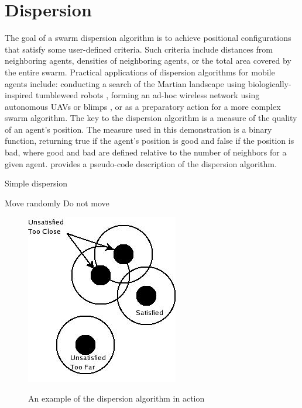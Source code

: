 \section{Dispersion}
\label{sec:Dispersion}

The goal of a swarm dispersion algorithm is to achieve positional configurations that satisfy some user-defined criteria.  Such criteria include distances from neighboring agents, densities of neighboring agents, or the total area covered by the entire swarm.  Practical applications of dispersion algorithms for mobile agents include: conducting a search of the Martian landscape using biologically-inspired tumbleweed robots \cite{kolacinski:SwarmRovers}, forming an ad-hoc wireless network using autonomous UAVs or blimps \cite{brown:AdHocUAV}, or as a preparatory action for a more complex swarm algorithm.  The key to the dispersion algorithm is a measure of the quality of an agent's position. The measure used in this demonstration is a binary function, returning true if the agent's position is good and false if the position is bad, where good and bad are defined relative to the number of neighbors for a given agent.   provides a pseudo-code description of the dispersion algorithm.

\begin{algorithm}[ht]
\caption{Simple dispersion}
\label{alg:SimpleDispersion}
	\begin{algorithmic}[1]
			\STATE Move randomly
		\ELSE
			\STATE Do not move
		\ENDIF
	\end{algorithmic}
\end{algorithm}

\begin{figure}[ht]
	\centering
	\includegraphics[scale=.65]{Figures/DispersionExample.jpg}
\label{fig:DispersionExample}
\caption{An example of the dispersion algorithm in action}
\end{figure}

